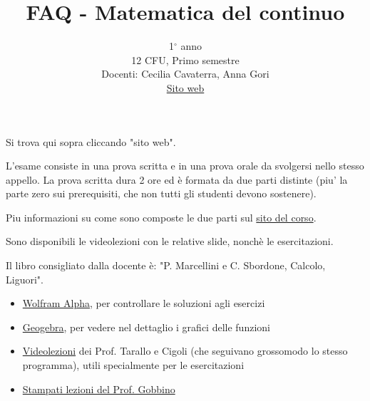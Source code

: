\documentclass{article}
\title{FAQ - \textbf{Matematica del continuo}}
\author{
	1$^{\circ}$ anno\\12 CFU, Primo semestre\\
	Docenti: Cecilia Cavaterra, Anna Gori\\ 
	\href{https://ccavaterramc.ariel.ctu.unimi.it/v5/home/Default.aspx}{Sito web}
	\date{}
}
\begin{document}
 
	\maketitle
	
	\begin{QuestionList}
		
		 {
		     Si trova qui sopra cliccando "sito web".
		 }
		
		 {
		    L'esame consiste in una prova scritta e in una prova orale da svolgersi nello stesso appello. 
		    La prova scritta dura 2 ore ed è formata da due parti distinte (piu' la parte zero sui prerequisiti, che non tutti gli studenti devono sostenere).
		    
		    Piu informazioni su come sono composte le due parti sul \href{https://ccavaterramc.ariel.ctu.unimi.it/v5/home/Default.aspx}{sito del corso}.
		}
		
		 {
		    Sono disponibili le videolezioni con le relative slide, nonchè le esercitazioni.
		    
		    Il libro consigliato dalla docente è: "P. Marcellini e C. Sbordone, Calcolo, Liguori".
		}
		
		 {
		    \begin{itemize}
		        \item  \href{https://www.wolframalpha.com/}{Wolfram Alpha}, per controllare le soluzioni agli esercizi
		
		        \item \href{https://www.geogebra.org/graphing}{Geogebra}, per vedere nel dettaglio i grafici delle funzioni
		
		        \item \href{http://vc.di.unimi.it/}{Videolezioni} dei Prof. Tarallo e Cigoli (che seguivano grossomodo lo stesso programma), utili specialmente per le esercitazioni
		
		        \item \href{https://goo.gl/9ADmUc}{Stampati lezioni del Prof. Gobbino} 
		        
		    \end{itemize}
		}
		
	\end{QuestionList}
	
\end{document}
